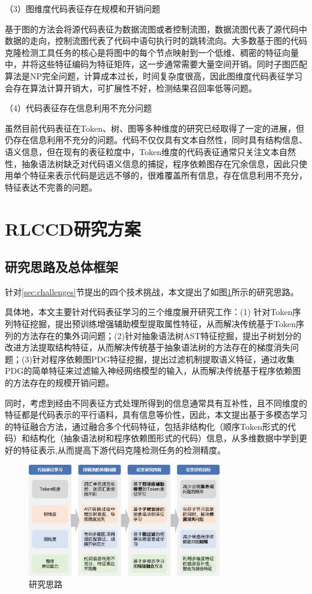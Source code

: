（3）图维度代码表征存在规模和开销问题

基于图的方法会将源代码表征为数据流图或者控制流图\cite{刘嘉勇2022源代码漏洞静态分析技术}，数据流图代表了源代码中数据的走向，控制流图代表了代码中语句执行时的跳转流向。大多数基于图的代码克隆检测工具任务的核心是将图中的每个节点映射到一个低维、稠密的特征向量中，并将这些特征编码为特征矩阵，这一步通常需要大量空间开销。同时子图匹配算法是NP完全问题，计算成本过长，时间复杂度很高，因此图维度代码表征学习会存在算法计算开销大，可扩展性不好，检测结果召回率低等问题。

（4）代码表征存在信息利用不充分问题

虽然目前代码表征在Token、树、图等多种维度的研究已经取得了一定的进展，但仍存在信息利用不充分的问题。代码不仅仅具有文本自然性，同时具有结构信息、语义信息，但在现有的表征粒度中，Token维度的代码表征通常只关注文本自然性，抽象语法树缺乏对代码语义信息的捕捉，程序依赖图存在冗余信息，因此只使用单个特征来表示代码是远远不够的，很难覆盖所有信息，存在信息利用不充分，特征表达不完善的问题。

\section{RLCCD研究方案}
\label{sec:Framework}

\subsection{研究思路及总体框架}
\label{subsec:Ideas}
针对\ref{sec:challenges}节提出的四个技术挑战，本文提出了如图\ref{fig:thinking}所示的研究思路。

具体地，本文主要针对代码表征学习的三个维度展开研究工作：(1) 针对Token序列特征挖掘，提出预训练增强辅助模型提取属性特征，从而解决传统基于Token序列的方法存在的集外词问题；(2)针对抽象语法树AST特征挖掘，提出子树划分的改进方法提取结构特征，从而解决传统基于抽象语法树的方法存在的梯度消失问题；(3)针对程序依赖图PDG特征挖掘，提出过滤机制提取语义特征，通过收集PDG的简单特征来过滤输入神经网络模型的输入，从而解决传统基于程序依赖图的方法存在的规模开销问题。

同时，考虑到经由不同表征方式处理所得到的信息通常具有互补性，且不同维度的特征都是代码表示的平行语料，具有信息等价性，因此，本文提出基于多模态学习的特征融合方法，通过融合多个代码特征，包括非结构化（顺序Token形式的代码）和结构化（抽象语法树和程序依赖图形式的代码）信息，从多维数据中学到更好的特征表示,从而提高下游代码克隆检测任务的检测精度。

\begin{figure}[htp]
    \centering
    \includegraphics[width=0.75\textwidth]{figures/thinking}
    \caption{研究思路}
    \label{fig:thinking}
\end{figure}

